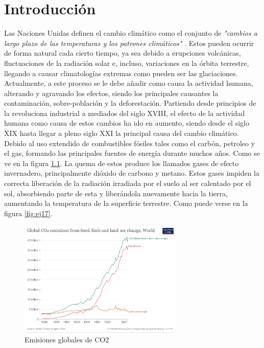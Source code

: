 \chapter[Introducción]{Introducción}
\label{Chap1}

Las Naciones Unidas definen el cambio climático como el conjunto de \textit{"cambios a largo plazo de las temperaturas y los patrones climáticos"} \cite{UNWeb}. Estos pueden ocurrir de forma natural cada cierto tiempo, ya sea debido a erupciones volcánicas, fluctuaciones de la radiación solar e, incluso, variaciones en la órbita terrestre, llegando a causar climatologías extremas como pueden ser las glaciaciones. Actualmente, a este proceso se le debe añadir como causa la actividad humana, alterando y agravando los efectos, siendo los principales causantes la contaminación, sobre-población y la deforestación.\newline
\newline
Partiendo desde principios de la revoluciona industrial a mediados del siglo XVIII, el efecto de la actividad humana como causa de estos cambios ha ido en aumento, siendo desde el siglo XIX hasta llegar a pleno siglo XXI la principal causa del cambio climático. Debido al uso extendido de combustibles fósiles tales como el carbón, petroleo y el gas, formando las principales fuentes de energía durante muchos años. Como se ve en la figura \ref{fig:ej16}.\newline
\newline
La quema de estos produce los llamados gases de efecto invernadero, principalmente dióxido de carbono y metano. Estos gases impiden la correcta liberación de la radiación irradiada por el suelo al ser calentado por el sol, absorbiendo parte de esta y liberándola nuevamente hacia la tierra, aumentando la temperatura de la superficie terrestre. Como puede verse en la figura \ref{fig:ej17}.

\begin{figure} [H]
	\centering
	\includegraphics[width=0.7\textwidth]{fig/global-co2-fossil-plus-land-use.png}
	\caption[Emisiones globales de CO2]{Emisiones globales de CO2 \footnotemark}
	\label{fig:ej16}
\end{figure}

